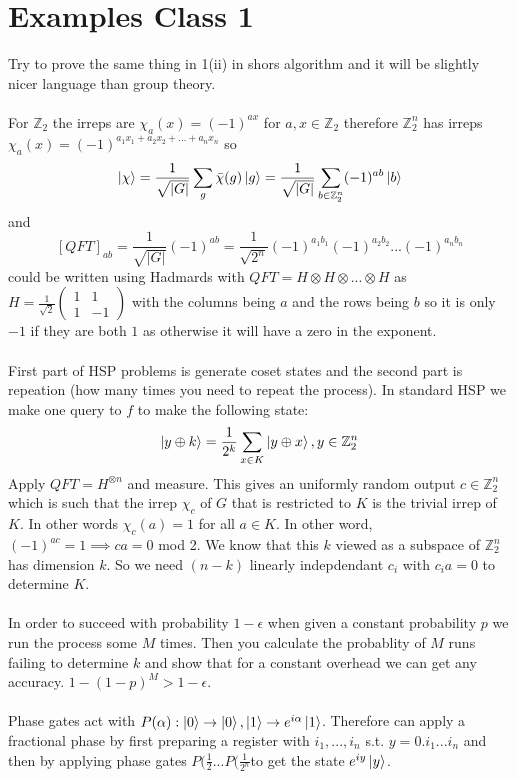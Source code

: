 \documentclass{article}
\begin{document}
{\section{Examples Class 1}
Try to prove the same thing in 1(ii) in shors algorithm and it will be slightly nicer language than group theory.\\\\
For $\mathbb{Z}_2$ the irreps are $\chi_a(x) = (-1)^{ax}$ for $a, x \in \mathbb{Z}_2$ therefore $\mathbb{Z}_2^n$ has irreps $\chi_a(x) = (-1)^{a_1 x_1 + a_2 x_2 +...+ a_n x_n}$ so
$$
\ket{\chi} = \frac{1}{\sqrt{|G|}} \sum_g \bar \chi( g) \ket{g} = \frac{1}{\sqrt{|G|}} \sum_{b \in \mathbb{Z}_2^n} (-1)^{a b} \ket{b}
$$
and
$$
[QFT]_{ab} = \frac{1}{\sqrt{|G|}} (-1)^{ab} = \frac{1}{\sqrt{2^n}} (-1)^{a_1 b_1} (-1)^{a_2 b_2} ... (-1)^{a_n b_n}
$$
                       could be written using Hadmards with $QFT = H \otimes H \otimes... \otimes H$ as $H = \frac{1}{\sqrt{2}}\begin{pmatrix} 1 & 1\\ 1& -1 \end{pmatrix}$ with the columns being $a$ and the rows being $b$ so it is only $-1$ if they are both $1$ as otherwise it will have a zero in the exponent.
\\\\
First part of HSP problems is generate coset states and the second part is repeation (how many times you need to repeat the process). In standard HSP we make one query to $f$ to make the following state:
$$
\ket{y \oplus k} = \frac{1}{2^k} \sum_{x \in K} \ket{y \oplus x}, y \in \mathbb{Z}_2^n
$$
Apply $QFT =  H^{\otimes n}$ and measure. This gives an uniformly random output $c \in \mathbb{Z}_2^n$ which is such that the irrep $\chi_c$ of $G$ that is restricted to $K$ is the trivial irrep of $K$. In other words $\chi_c(a) = 1$ for all $a \in K$. In other word, $(-1)^{ac} = 1 \implies c a = 0$ mod 2. We know that this $k$ viewed as a subspace of $\mathbb{Z}_2^n$ has dimension $k$. So we need $(n-k)$ linearly indepdendant $c_i$ with $c_i a = 0$ to determine $K$.\\\\
In order to succeed with probability $1- \epsilon$ when given a constant probability $p$ we run the process some $M$ times. Then you calculate the probablity of $M$ runs failing to determine $k$ and show that for a constant overhead we can get any accuracy. $1- (1-p)^M > 1- \epsilon$.\\\\
Phase gates act with $P(\alpha) : \ket{0} \rightarrow \ket{0}, \ket{1} \rightarrow e^{i \alpha}\ket{1}$. Therefore can apply a fractional phase by first preparing a register with $i_1,...,i_n$ s.t. $y= 0.i_1...i_n$ and then by applying phase gates $P(\frac{1}{2}...P(\frac{1}{2^n}$to get the state $e^{iy}\ket{y}$.\\\\
}
\end{document}
